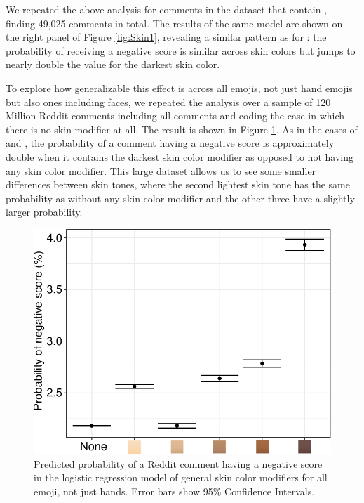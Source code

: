 \documentclass{article}
\begin{document}
We repeated the above analysis for comments in the dataset that contain , finding 49,025 comments in total. The results of the same model are shown on the right panel of Figure \ref{fig:Skin1}, revealing a similar pattern as for : the probability of receiving a negative score is similar across skin colors but jumps to nearly double the value for the darkest skin color.

To explore how generalizable this effect is across all emojis, not just hand emojis but also ones including faces, we repeated the analysis over a sample of 120 Million Reddit comments including all comments and coding the case in which there is no skin modifier at all. The result is shown in Figure \ref{fig:Skin2}. As in the cases of  and , the probability of a comment having a negative score is approximately double when it contains the darkest skin color modifier as opposed to not having any skin color modifier. This large dataset allows us to see some smaller differences between skin tones, where the second lightest skin tone has the same probability as without any skin color modifier and the other three have a slightly larger probability. 

\begin{figure}[h!]
    \centering
    \includegraphics[width=0.6\linewidth]{Plots/FullSkinResults.pdf}
    \caption{Predicted probability of a Reddit comment having a negative score in the logistic regression model of general skin color modifiers for all emoji, not just hands. Error bars show 95\% Confidence Intervals.}
    \label{fig:Skin2}
\end{figure}
\end{document}
